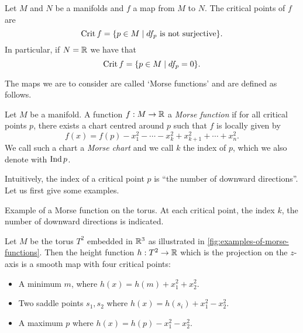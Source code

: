 \begin{definition}
    Let $M$ and $N$ be a manifolds and  $f$ a map from $M$ to $N$.
    The critical points of $f$ are
    \[
    \operatorname{Crit} f = \{p \in M  \mid \text{$df_p$ is not surjective}\} 
    .\] 
    In particular, if $N = \mathbb{R}$ we have that
    \[
    \operatorname{Crit} f = \{ p \in M  \mid  df_p = 0\} 
    .\] 
\end{definition}
The maps we are to consider are called `Morse functions' and are defined as follows.
\begin{definition}
    Let $M$ be a manifold. A function $f: M \to  \mathbb{R}$ a \emph{Morse function} if for all critical points $p$, there exists a chart centred around $p$ such that $f$ is locally given by
    \[
        f(x) = f(p) -x_1^2 - \cdots - x_k^2 + x_{k+1}^2 + \cdots + x_n^2
    .\] 
    We call such a chart a \emph{Morse chart} and we call $k$ the index of $p$, which we also denote with $\operatorname{Ind} p$.
    
\end{definition}
Intuitively, the index of a critical point $p$ is ``the number of downward directions''.
Let us first give some examples.
\begin{marginfigure}
    \centering
    \caption{Example of a Morse function on the torus. At each critical point, the index $k$, the number of downward directions is indicated. }
    \label{fig:examples-of-morse-functions}
\end{marginfigure}
\begin{eg}
    Let $M$ be the torus  $T^2$ embedded in $\mathbb{R}^3$ as illustrated in \cref{fig:examples-of-morse-functions}.
    Then the height function $h: T^2 \to  \mathbb{R}$ which is the projection on the $z$-axis is a smooth map with four critical points:
    \begin{itemize}
        \item A minimum $m$, where $h(x) = h(m) + x_1^2 + x_2^2$.
        \item Two saddle points $s_1, s_2$ where $h(x) = h(s_i) + x_1^2 - x_2^2$.
        \item A maximum $p$ where $h(x) = h(p) - x_1^2 - x_2^2$.
    \end{itemize}
\end{eg}

